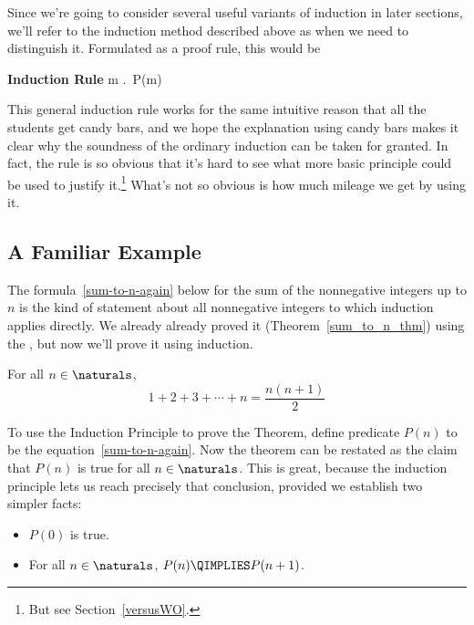 Since we're going to consider several useful variants of induction in
later sections, we'll refer to the induction method described above as
 when we need to distinguish it.  Formulated as 
a proof rule, this would be
\begin{rul*} \textbf{Induction Rule}
{\forall m \in \naturals.\, P(m)}
\end{rul*}

This general induction rule works for the same intuitive reason that all
the students get candy bars, and we hope the explanation using candy bars
makes it clear why the soundness of the ordinary induction can be taken
for granted.  In fact, the rule is so obvious that it's hard to see what
more basic principle could be used to justify it.\footnote{But see
Section~\ref{versusWO}.}  What's not so obvious is how much mileage 
we get by using it.

\subsection{A Familiar Example}

The formula~\eqref{sum-to-n-again} below for the sum of the nonnegative
integers up to $n$ is the kind of statement about all nonnegative integers
to which induction applies directly.  We already already proved it
(Theorem~\ref{sum_to_n_thm}) using the , but
now we'll prove it using induction.
\begin{theorem*}%
For all $n \in \naturals$,
\begin{equation}\label{sum-to-n-again}
1 + 2 + 3 + \cdots + n = \frac{n(n+1)}{2}
\end{equation}
\end{theorem*}

To use the Induction Principle to prove the Theorem, define predicate
$P(n)$ to be the equation~\eqref{sum-to-n-again}.  Now the theorem can
be restated as the claim that $P(n)$ is true for all $n \in
\naturals$.  This is great, because the induction principle lets us
reach precisely that conclusion, provided we establish two simpler
facts:
%
\begin{itemize}
\item $P(0)$ is true.
\item For all $n \in \naturals$, $P(n) \QIMPLIES P(n+1)$.
\end{itemize}

